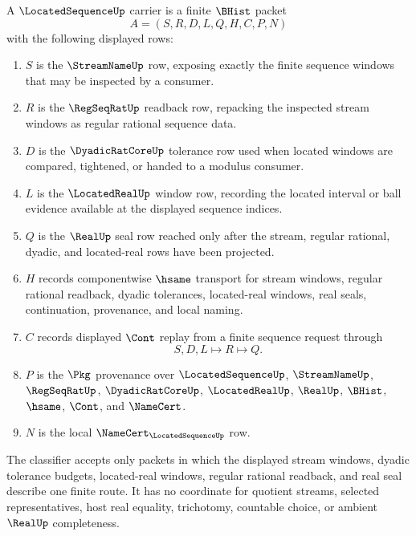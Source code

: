 \begin{definition}
\label{def:located-sequence-carrier}
A $\LocatedSequenceUp$ carrier is a finite $\BHist$ packet
$$
A=(S,R,D,L,Q,H,C,P,N)
$$
with the following displayed rows:
\begin{enumerate}
\item $S$ is the $\StreamNameUp$ row, exposing exactly the finite sequence windows that may be inspected by a consumer.
\item $R$ is the $\RegSeqRatUp$ readback row, repacking the inspected stream windows as regular rational sequence data.
\item $D$ is the $\DyadicRatCoreUp$ tolerance row used when located windows are compared, tightened, or handed to a modulus consumer.
\item $L$ is the $\LocatedRealUp$ window row, recording the located interval or ball evidence available at the displayed sequence indices.
\item $Q$ is the $\RealUp$ seal row reached only after the stream, regular rational, dyadic, and located-real rows have been projected.
\item $H$ records componentwise $\hsame$ transport for stream windows, regular rational readback, dyadic tolerances, located-real windows, real seals, continuation, provenance, and local naming.
\item $C$ records displayed $\Cont$ replay from a finite sequence request through
$$
S,D,L \longmapsto R \longmapsto Q .
$$
\item $P$ is the $\Pkg$ provenance over $\LocatedSequenceUp$, $\StreamNameUp$, $\RegSeqRatUp$, $\DyadicRatCoreUp$, $\LocatedRealUp$, $\RealUp$, $\BHist$, $\hsame$, $\Cont$, and $\NameCert$.
\item $N$ is the local $\NameCert_{\LocatedSequenceUp}$ row.
\end{enumerate}
The classifier accepts only packets in which the displayed stream windows, dyadic tolerance budgets, located-real windows, regular rational readback, and real seal describe one finite route. It has no coordinate for quotient streams, selected representatives, host real equality, trichotomy, countable choice, or ambient $\RealUp$ completeness.
\end{definition}

